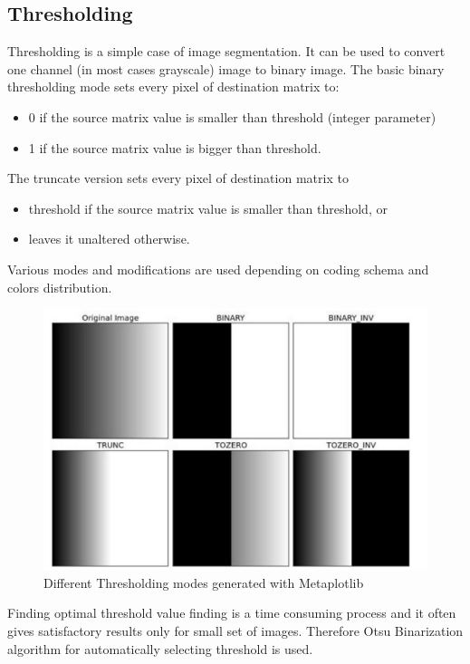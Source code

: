 \documentclass[12pt,twoside,a4paper]{article}
\begin{document}
\subsection{Thresholding}

Thresholding is a simple case of image segmentation.
It can be used to convert one channel (in most cases grayscale) image to binary image.
The basic binary thresholding mode sets every pixel of destination matrix to:
\begin{itemize}
\item 0 if the source matrix value is smaller than threshold (integer parameter)
\item 1 if the source matrix value is bigger than threshold.
\end{itemize}
The truncate version sets every pixel of destination matrix to
\begin{itemize}
\item threshold if the source matrix value is smaller than threshold, or
\item leaves it unaltered otherwise.
\end{itemize}
Various modes and modifications are used depending on coding schema and colors distribution.
  
\begin{figure}[H]
\centering
\includegraphics[width=0.4\paperwidth]{thr}
\caption{Different Thresholding modes generated with Metaplotlib}
\end{figure}


Finding optimal threshold value finding is a time consuming process and it often gives satisfactory results only for small set of images.
Therefore Otsu Binarization algorithm for automatically selecting threshold is used.
\end{document}
